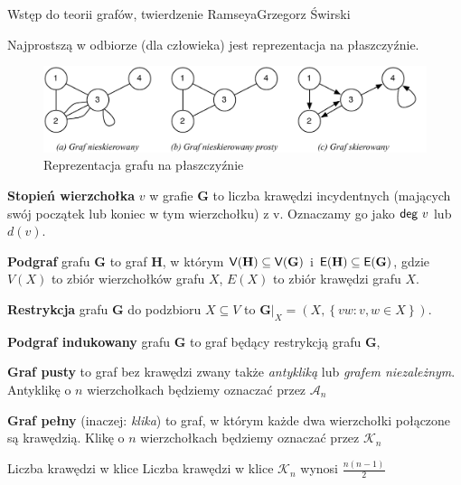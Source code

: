 \begin{referat}{Wstęp do teorii grafów, twierdzenie Ramseya}{Grzegorz Świrski}
\begin{teoria}
Najprostszą w odbiorze (dla człowieka) jest reprezentacja na płaszczyźnie.
\begin{figure}[h]
  \centering
  \includegraphics[scale=0.65]{./swirski/graph_types.pdf}
  \caption{Reprezentacja grafu na płaszczyźnie}
\end{figure}

\textbf{Stopień wierzchołka} $v$ w grafie $\mathbf{G}$ to liczba krawędzi incydentnych (mających swój początek lub koniec w tym wierzchołku) z v. Oznaczamy go jako ${\sf deg} \ v$ lub $d(v)$.

\textbf{Podgraf} grafu $\mathbf{G}$ to graf $\mathbf{H}$, w którym ${\sf V}\!\left(\mathbf{H}\right)\subseteq{\sf V}\!\left(\mathbf{G}\right)$ i ${\sf E}\!\left(\mathbf{H}\right)\subseteq{\sf E}\!\left(\mathbf{G}\right)$, gdzie $V(X)$ to zbiór wierzchołków grafu $X$, $E(X)$ to zbiór krawędzi grafu $X$.

\textbf{Restrykcja} grafu $\mathbf{G}$ do podzbioru $X\subseteq V$ to $\mathbf{G}|_X=\left( X,\left\lbrace vw:v,w\in X \right\rbrace \right)$.

\textbf{Podgraf indukowany} grafu $\mathbf{G}$ to graf będący restrykcją grafu $\mathbf{G}$,

\textbf{Graf pusty} to graf bez krawędzi zwany także \emph{antykliką} lub \emph{grafem niezależnym}. Antyklikę o $n$ wierzchołkach będziemy oznaczać przez $\mathcal{A}_{n}$

\textbf{Graf pełny} (inaczej: \emph{klika}) to graf, w którym każde dwa wierzchołki połączone są krawędzią. Klikę o $n$ wierzchołkach będziemy oznaczać przez $\mathcal{K}_{n}$


\begin{twierdzenie}{Liczba krawędzi w klice}
Liczba krawędzi w klice $\mathcal{K}_{n}$ wynosi $\frac{n(n-1)}{2}$
\end{twierdzenie}


\end{teoria}
\end{referat}

